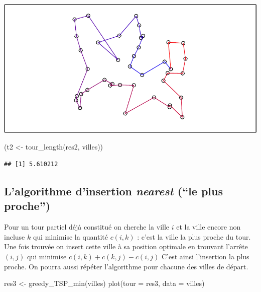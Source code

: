 \documentclass[
]{article}
\newenvironment{Shaded}{\begin{snugshade}}{\end{snugshade}}
\newcommand{\AttributeTok}[1]{\textcolor[rgb]{0.77,0.63,0.00}{#1}}
\newcommand{\FunctionTok}[1]{\textcolor[rgb]{0.00,0.00,0.00}{#1}}
\newcommand{\NormalTok}[1]{#1}
\newcommand{\OtherTok}[1]{\textcolor[rgb]{0.56,0.35,0.01}{#1}}
\begin{document}
\includegraphics{rapport_TSP_files/figure-latex/unnamed-chunk-5-1.pdf}

\begin{Shaded}
\begin{Highlighting}[]
\NormalTok{(t2 }\OtherTok{\textless{}{-}} \FunctionTok{tour\_length}\NormalTok{(res2, villes))}
\end{Highlighting}
\end{Shaded}

\begin{verbatim}
## [1] 5.610212
\end{verbatim}

\hypertarget{lalgorithme-dinsertion-nearest-le-plus-proche}{%
\subsection{\texorpdfstring{L'algorithme d'insertion \emph{nearest}
(``le plus
proche'')}{L'algorithme d'insertion nearest (``le plus proche'')}}\label{lalgorithme-dinsertion-nearest-le-plus-proche}}

Pour un tour partiel déjà constitué on cherche la ville \(i\) et la
ville encore non incluse \(k\) qui minimise la quantité \(c(i,k)\) :
c'est la ville la plus proche du tour. Une fois trouvée on insert cette
ville à sa position optimale en trouvant l'arrête \((i,j)\) qui minimise
\(c(i,k) + c(k,j) - c(i,j)\) C'est ainsi l'insertion la plus proche. On
pourra aussi répéter l'algorithme pour chacune des villes de départ.

\begin{Shaded}
\begin{Highlighting}[]
\NormalTok{res3 }\OtherTok{\textless{}{-}} \FunctionTok{greedy\_TSP\_min}\NormalTok{(villes)}
\FunctionTok{plot}\NormalTok{(}\AttributeTok{tour =}\NormalTok{ res3, }\AttributeTok{data =}\NormalTok{ villes)}
\end{Highlighting}
\end{Shaded}
\end{document}
